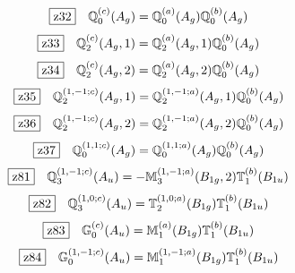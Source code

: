 \documentclass[fleqn,10pt,landscape]{jsarticle}
\begin{document}
\begin{dmath*}
\hspace*{3mm}\fbox{z32}\quad \mathbb{Q}_{0}^{(c)}(A_{g})=\mathbb{Q}_{0}^{(a)}(A_{g}) \mathbb{Q}_{0}^{(b)}(A_{g})
\end{dmath*}
\begin{dmath*}
\hspace*{3mm}\fbox{z33}\quad \mathbb{Q}_{2}^{(c)}(A_{g},1)=\mathbb{Q}_{2}^{(a)}(A_{g},1) \mathbb{Q}_{0}^{(b)}(A_{g})
\end{dmath*}
\begin{dmath*}
\hspace*{3mm}\fbox{z34}\quad \mathbb{Q}_{2}^{(c)}(A_{g},2)=\mathbb{Q}_{2}^{(a)}(A_{g},2) \mathbb{Q}_{0}^{(b)}(A_{g})
\end{dmath*}
\begin{dmath*}
\hspace*{3mm}\fbox{z35}\quad \mathbb{Q}_{2}^{(1,-1;c)}(A_{g},1)=\mathbb{Q}_{2}^{(1,-1;a)}(A_{g},1) \mathbb{Q}_{0}^{(b)}(A_{g})
\end{dmath*}
\begin{dmath*}
\hspace*{3mm}\fbox{z36}\quad \mathbb{Q}_{2}^{(1,-1;c)}(A_{g},2)=\mathbb{Q}_{2}^{(1,-1;a)}(A_{g},2) \mathbb{Q}_{0}^{(b)}(A_{g})
\end{dmath*}
\begin{dmath*}
\hspace*{3mm}\fbox{z37}\quad \mathbb{Q}_{0}^{(1,1;c)}(A_{g})=\mathbb{Q}_{0}^{(1,1;a)}(A_{g}) \mathbb{Q}_{0}^{(b)}(A_{g})
\end{dmath*}
\begin{dmath*}
\hspace*{3mm}\fbox{z81}\quad \mathbb{Q}_{3}^{(1,-1;c)}(A_{u})=- \mathbb{M}_{3}^{(1,-1;a)}(B_{1g},2) \mathbb{T}_{1}^{(b)}(B_{1u})
\end{dmath*}
\begin{dmath*}
\hspace*{3mm}\fbox{z82}\quad \mathbb{Q}_{3}^{(1,0;c)}(A_{u})=\mathbb{T}_{2}^{(1,0;a)}(B_{1g}) \mathbb{T}_{1}^{(b)}(B_{1u})
\end{dmath*}
\begin{dmath*}
\hspace*{3mm}\fbox{z83}\quad \mathbb{G}_{0}^{(c)}(A_{u})=\mathbb{M}_{1}^{(a)}(B_{1g}) \mathbb{T}_{1}^{(b)}(B_{1u})
\end{dmath*}
\begin{dmath*}
\hspace*{3mm}\fbox{z84}\quad \mathbb{G}_{0}^{(1,-1;c)}(A_{u})=\mathbb{M}_{1}^{(1,-1;a)}(B_{1g}) \mathbb{T}_{1}^{(b)}(B_{1u})
\end{dmath*}
\end{document}
